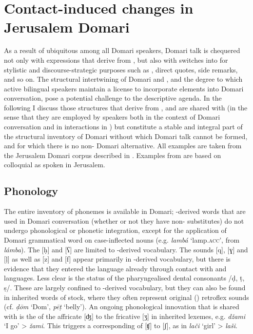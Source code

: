\documentclass[output=paper]{langsci/langscibook}
\begin{document}
\section{Contact-induced changes in Jerusalem Domari}

As a result of ubiquitous  among all Domari speakers, Domari talk is chequered not only with expressions that derive from , but also with switches into  for stylistic and discourse-strategic purposes such as , direct quotes, side remarks, and so on. The structural intertwining of Domari and , and the degree to which active bilingual speakers maintain a license to incorporate  elements into Domari conversation, pose a potential challenge to the descriptive agenda. In the following I discuss those structures that derive from , and are shared with  (in the sense that they are employed by speakers both in the context of Domari conversation and in interactions in ) but constitute a stable and integral part of the structural inventory of Domari without which Domari talk cannot be formed, and for which there is no non- Domari alternative. All examples are taken from the Jerusalem Domari corpus described in \citet{Matras2012}. Examples from  are based on colloquial   as spoken in Jerusalem.

\subsection{Phonology}

The entire inventory of   phonemes is available in Domari; -derived words that are used in Domari conversation (whether or not they have non- substitutes) do not undergo phonological or phonetic integration, except for the application of Domari grammatical word  on case-inflected nouns (e.g. \textit{lambá} ‘lamp.\textsc{acc}’, from  \textit{lámba}). The  [ḥ] and [{ʕ}] are limited to -derived vocabulary. The sounds [q], [{ɣ}] and [ḷ] as well as [z] and [f] appear primarily in -derived vocabulary, but there is evidence that they entered the language already through contact with  and  languages. Less clear is the status of the pharyngealised dental consonants /ḍ, ṭ, ṣ/. These are largely confined to -derived vocabulary, but they can also be found in inherited words of  stock, where they often represent original () retroflex sounds (cf. \textit{ḍōm} ‘Dom’, \textit{pēṭ} ‘belly’). An ongoing phonological innovation that is shared with   is the  of the affricate [{ʤ}] to the fricative [{ʒ}] in inherited lexemes, e.g. \textit{džami} ‘I go’ > \textit{žami}. This triggers a corresponding  of [{ʧ}] to [{ʃ}], as in \textit{lači} ‘girl’ > \textit{laši}.
\end{document}
